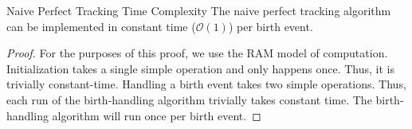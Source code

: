 \begin{theorem}{Naive Perfect Tracking Time Complexity}
\label{thm:perfect-tracking-time}
The naive perfect tracking algorithm can be implemented in constant time ($\mathcal{O}(1)$) per birth event.
\end{theorem}

\begin{proof}
\label{prf:perfect-tracking-time}
For the purposes of this proof, we use the RAM model of computation. 
Initialization takes a single simple operation and only happens once. 
Thus, it is trivially constant-time.
Handling a birth event takes two simple operations.
Thus, each run of the birth-handling algorithm trivially takes constant time.
The birth-handling algorithm will run once per birth event.
\end{proof}

